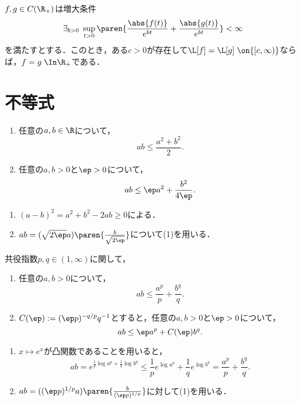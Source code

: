\documentclass[uplatex,dvipdfmx]{jsreport}
\begin{document}
\begin{theorem}\label{thm-uniqueness-of-Laplace-transform}
    $f,g\in C(\R_+)$は増大条件
    \[\exists_{b>0}\;\sup_{t>0}\paren{\frac{\abs{f(t)}}{e^{bt}}+\frac{\abs{g(t)}}{e^{bt}}}<\infty\]
    を満たすとする．このとき，ある$c>0$が存在して$\L[f]=\L[g]\;\on{[c,\infty)}$ならば，$f=g\;\In\R_+$である．
\end{theorem}

\section{不等式}

\begin{proposition}[Cauchyの不等式]\mbox{}
    \begin{enumerate}
        \item 任意の$a,b\in\R$について，
        \[ab\le\frac{a^2+b^2}{2}.\]
        \item 任意の$a,b>0$と$\ep>0$について，
        \[ab\le\ep a^2+\frac{b^2}{4\ep}.\]
    \end{enumerate}
\end{proposition}
\begin{Proof}\mbox{}
    \begin{enumerate}
        \item $(a-b)^2=a^2+b^2-2ab\ge0$による．
        \item $ab=(\sqrt{2\ep}a)\paren{\frac{b}{\sqrt{2\ep}}}$について(1)を用いる．
    \end{enumerate}
\end{Proof}

\begin{proposition}[Youngの不等式]
    共役指数$p,q\in(1,\infty)$に関して，
    \begin{enumerate}
        \item 任意の$a,b>0$について，
        \[ab\le\frac{a^p}{p}+\frac{b^q}{q}.\]
        \item $C(\ep):=(\ep p)^{-q/p}q^{-1}$とすると，任意の$a,b>0$と$\ep>0$について，
        \[ab\le\ep a^p+C(\ep)b^q.\]
    \end{enumerate}
\end{proposition}
\begin{Proof}\mbox{}
    \begin{enumerate}
        \item $x\mapsto e^x$が凸関数であることを用いると，
        \[ab=e^{\frac{1}{p}\log a^p+\frac{1}{q}\log b^q}\le\frac{1}{p}e^{\log a^p}+\frac{1}{q}e^{\log b^q}=\frac{a^p}{p}+\frac{b^q}{q}.\]
        \item $ab=((\ep p)^{1/p}a)\paren{\frac{b}{(\ep p)^{1/p}}}$に対して(1)を用いる．
    \end{enumerate}
\end{Proof}
\end{document}
